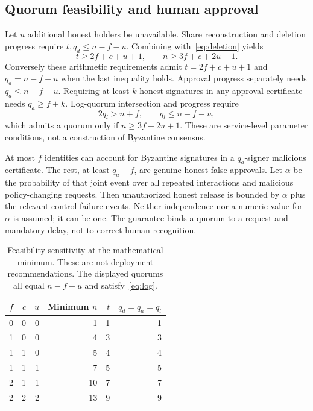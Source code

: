 \documentclass[pdflatex,sn-mathphys-num]{sn-jnl}
\theoremstyle{plain}
\theoremstyle{definition}
\begin{document}
\subsection{Quorum feasibility and human approval}
Let $u$ additional honest holders be unavailable. Share reconstruction and deletion progress require $t,q_d\le n-f-u$. Combining with~\eqref{eq:deletion} yields
\begin{equation}\label{eq:feasible}
 t\ge2f+c+u+1,\qquad n\ge3f+c+2u+1.
\end{equation}
Conversely these arithmetic requirements admit $t=2f+c+u+1$ and $q_d=n-f-u$ when the last inequality holds. Approval progress separately needs $q_a\le n-f-u$. Requiring at least $k$ honest signatures in any approval certificate needs $q_a\ge f+k$. Log-quorum intersection and progress require
\begin{equation}\label{eq:log}
 2q_l>n+f,\qquad q_l\le n-f-u,
\end{equation}
which admits a quorum only if $n\ge3f+2u+1$. These are service-level parameter conditions, not a construction of Byzantine consensus.

At most $f$ identities can account for Byzantine signatures in a $q_a$-signer malicious certificate. The rest, at least $q_a-f$, are genuine honest false approvals. Let $\alpha$ be the probability of that joint event over all repeated interactions and malicious policy-changing requests. Then unauthorized honest release is bounded by $\alpha$ plus the relevant control-failure events. Neither independence nor a numeric value for $\alpha$ is assumed; it can be one. The guarantee binds a quorum to a request and mandatory delay, not to correct human recognition.

\begin{table}[htbp]
\caption{Feasibility sensitivity at the mathematical minimum. These are not deployment recommendations. The displayed quorums all equal $n-f-u$ and satisfy~\eqref{eq:log}.}\label{tab:sensitivity}
\centering\small
\begin{tabular}{@{}rrrrrr@{}}\toprule
$f$&$c$&$u$&Minimum $n$&$t$&$q_d=q_a=q_l$\\\midrule
0&0&0&1&1&1\\
1&0&0&4&3&3\\
1&1&0&5&4&4\\
1&1&1&7&5&5\\
2&1&1&10&7&7\\
2&2&2&13&9&9\\\bottomrule
\end{tabular}
\end{table}
\end{document}
